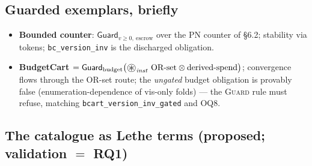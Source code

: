 \documentclass[11pt]{article}
\newcommand{\lean}[1]{\texttt{#1}}
\newcommand{\Guard}{\mathsf{Guard}}
\newcommand{\sepmap}{\mathop{\vcenter{\hbox{\Large$\circledast$}}}}
\begin{document}
\subsection{Guarded exemplars, briefly}

\begin{itemize}[leftmargin=2em]
\item \textbf{Bounded counter}: $\Guard_{v \geq 0,\ \text{escrow}}$
  over the PN counter of \S6.2; stability via tokens;
  \lean{bc\_version\_inv} is the discharged obligation.
\item \textbf{BudgetCart} $= \Guard_{\text{budget}}\bigl(
  \sepmap_{\mathit{inst}}\, \text{OR-set} \otimes
  \text{derived-spend}\bigr)$; convergence flows through the OR-set
  route; the \emph{ungated} budget obligation is provably false
  (enumeration-dependence of vis-only folds) --- the \textsc{Guard} rule
  must refuse, matching \lean{bcart\_version\_inv\_gated} and OQ8.
\end{itemize}

\subsection{The catalogue as Lethe terms (proposed; validation $=$ RQ1)}
\label{sec:catalogue}
\end{document}
